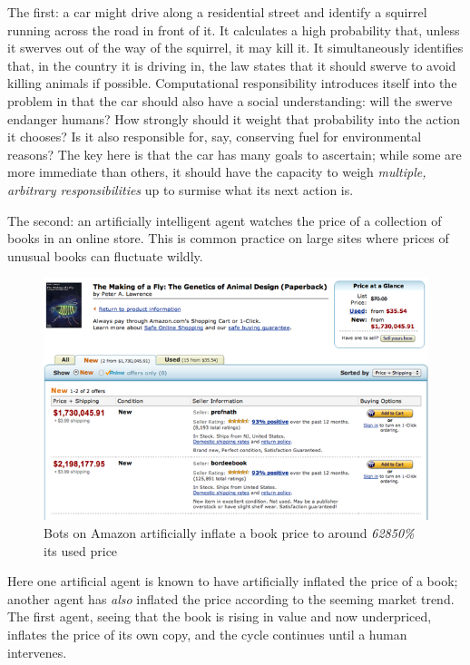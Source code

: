 \documentclass{mprop}
\begin{document}
The first: a car might drive along a residential street and identify a squirrel running across the road in front of it. It calculates a high probability that, unless it swerves out of the way of the squirrel, it may kill it. It simultaneously identifies that, in the country it is driving in, the law states that it should swerve to avoid killing animals if possible. Computational responsibility introduces itself into the problem in that the car should also have a social understanding: will the swerve endanger humans? How strongly should it weight that probability into the action it chooses? Is it also responsible for, say, conserving fuel for environmental reasons? The key here is that the car has many goals to ascertain; while some are more immediate than others, it should have the capacity to weigh \emph{multiple, arbitrary responsibilities} up to surmise what its next action is. \par

The second: an artificially intelligent agent watches the price of a collection of books in an online store. This is common practice on large sites where prices of unusual books can fluctuate wildly. 

\begin{figure}[ht]
\centering
\includegraphics[trim=0.7cm 0.7cm 0.7cm 0.7cm, scale=0.75]{images/amazon_price_hike_fly_genetics}
\caption{Bots on Amazon artificially inflate a book price to around \emph{62850\%} its used price}
\end{figure}

Here one artificial agent is known to have artificially inflated the price of a book; another agent has \emph{also} inflated the price according to the seeming market trend. The first agent, seeing that the book is rising in value and now underpriced, inflates the price of its own copy, and the cycle continues until a human intervenes. \par
\end{document}

